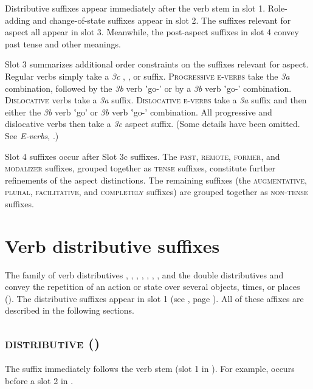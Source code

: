 Distributive suffixes appear immediately after the verb stem in slot 1. Role-adding and change-of-state suffixes appear in slot 2. The suffixes relevant for aspect all appear in slot 3. Meanwhile, the post-aspect suffixes in slot 4 convey past tense and other meanings. 

Slot 3 summarizes additional order constraints on the suffixes relevant for aspect. Regular verbs simply take a \textit{3c} \habitual, \stative, or {\punctual} suffix. \textsc{Progressive e-verbs} take the \textit{3a}  {\progressive} combination, followed by the \textit{3b} verb  ‛go-\punctual' or by a \textit{3b} verb  ‛go-{\purposive}' combination. \textsc{Dislocative} verbs take a \textit{3a} {\dislocative} suffix. \textsc{Dislocative e-verbs} take a \textit{3a} {\dislocative} suffix and then either the \textit{3b} verb  ‛go' or \textit{3b} verb  ‛go-{\purposive}' combination. All progressive and dislocative verbs then take a \textit{3c} aspect suffix. (Some details have been omitted. See \textit{E-verbs}, .) 

Slot 4 suffixes occur after Slot 3c suffixes. The \textsc{past}, \textsc{remote}, \textsc{former}, and \textsc{modalizer} suffixes, grouped together as \textsc{tense} suffixes, constitute further refinements of the aspect distinctions. The remaining suffixes (the \textsc{augmentative}, \textsc{plural}, \textsc{facilitative}, and \textsc{completely} suffixes) are grouped together as \textsc{non-tense} suffixes.


\section{Verb distributive suffixes} \label{Verb pluralizer and distributive suffixes}
The family of verb distributives , , , , , , , and the double distributives  and  convey the repetition of an action or state over several objects, times, or places (\cite[505]{mithun_watewayestanih_1984}). The distributive suffixes appear in slot 1 (see , page \pageref{figtab:1:verbsuffixorder}). All of these affixes are described in the following sections.


\subsection{ \textsc{distributive} (\distributive)} \label{[-ˀse] (pluralizer)}
The  {\distributive} suffix immediately follows the verb stem (slot 1 in ). For example,  occurs before a slot 2  {\causative} in .

